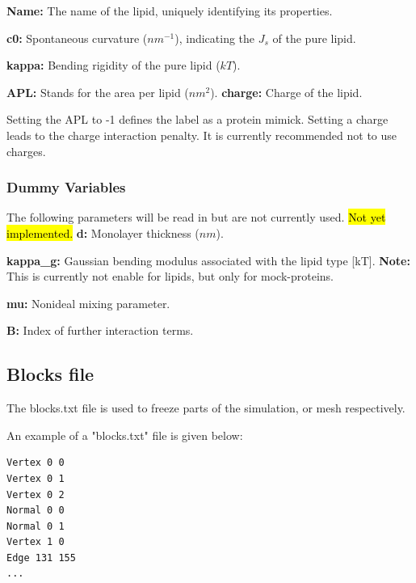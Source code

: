 \documentclass[11pt]{article}
\begin{document}
\noindent
\textbf{Name:} The name of the lipid, uniquely identifying its properties.

\noindent
\textbf{c0:} Spontaneous curvature ($nm^{-1}$), indicating the $J_s$ of the pure lipid.

\noindent
\textbf{kappa:} Bending rigidity of the pure lipid ($kT$).%

\noindent
\textbf{APL:} Stands for the area per lipid ($nm^2$).%
\noindent
\textbf{charge:} Charge of the lipid.%

\begin{tcolorbox}[colback=orange!5!white,colframe=orange!75!black,title=Clarification]
Setting the APL to -1 defines the label as a protein mimick.
Setting a charge leads to the charge interaction penalty. It is currently recommended not to use charges.
\end{tcolorbox}
\noindent

\noindent
\subsubsection*{Dummy Variables}
\noindent
The following parameters will be read in but are not currently used. \hl{Not yet implemented.}
\textbf{d:} Monolayer thickness ($nm$).%


\noindent
\textbf{kappa\_g:} Gaussian bending modulus associated with the lipid type [kT]. \textbf{Note:} This is currently not enable for lipids, but only for mock-proteins.%

\noindent
\textbf{mu:} Nonideal mixing parameter.

\noindent
\textbf{B:} Index of further interaction terms.


\subsection{Blocks file}
The blocks.txt file is used to freeze parts of the simulation, or mesh respectively. 

\noindent
An example of a "blocks.txt" file is given below:
\begin{mdframed}[backgroundcolor=lightgray, linecolor=lightgray]  %

\begin{verbatim}
Vertex 0 0
Vertex 0 1
Vertex 0 2
Normal 0 0
Normal 0 1
Vertex 1 0
Edge 131 155
...
\end{verbatim}
\end{mdframed}
\end{document}
